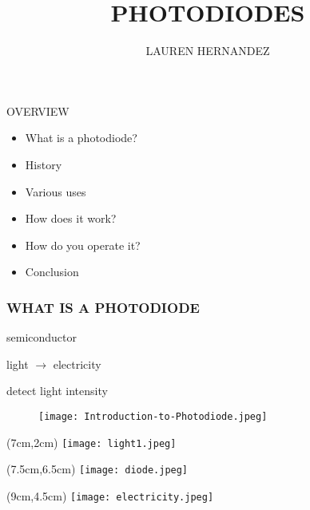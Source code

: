 \documentclass[14pt]{beamer}
\title{PHOTODIODES}
\author{LAUREN HERNANDEZ}
\begin{document}


\begin{frame}
\titlepage
\end{frame}


	
\begin{frame}{OVERVIEW}
\tableofcontents

\begin{flushleft}
\begin{itemize}
	\item What is a photodiode?
	\vspace{5mm}
	\item History
	\vspace{5mm}
	\item Various uses
	\vspace{5mm}
	\item How does it work?
	\vspace{5mm}
	\item How do you operate it?
	\vspace{5mm}
	\item Conclusion
\end{itemize}
\end{flushleft}
\end{frame}


\begin{frame}
	
	\frametitle{WHAT IS A PHOTODIODE}
	\begin{flushleft}
	\begin{list}{--}{}
		\item semiconductor
		\item light $\rightarrow$ electricity
		\item detect light intensity
	\end{list}
	\end{flushleft}	
	\vspace{5mm}
	\begin{figure}[H]
	\begin{flushleft}
	\texttt{[image: Introduction-to-Photodiode.jpeg]}
	\end{flushleft}
	\end{figure}

\begin{textblock*}{6cm}(7cm,2cm) %
	\texttt{[image: light1.jpeg]}
\end{textblock*}

\begin{textblock*}{3cm}(7.5cm,6.5cm) %
	\texttt{[image: diode.jpeg]}
\end{textblock*}

\begin{textblock*}{3cm}(9cm,4.5cm) %
	\texttt{[image: electricity.jpeg]}
\end{textblock*}
	
\end{frame}
\end{document}
